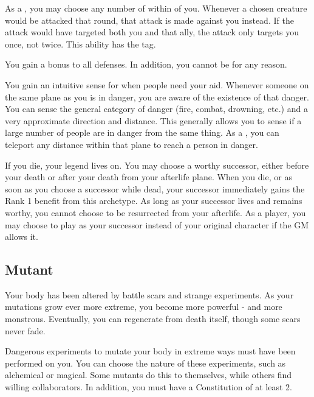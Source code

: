              As a , you may choose any number of  within \shortrange of you.
            Whenever a chosen creature would be attacked that round, that attack is made against you instead.
            If the attack would have targeted both you and that ally, the attack only targets you once, not twice.
            This ability has the  tag.

             You gain a  bonus to all defenses.
            In addition, you cannot be \vulnerable for any reason.

             You gain an intuitive sense for when people need your aid.
            Whenever someone on the same plane as you is in danger, you are aware of the existence of that danger.
            You can sense the general category of danger (fire, combat, drowning, etc.) and a very approximate direction and distance.
            This generally allows you to sense if a large number of people are in danger from the same thing.
            As a , you can teleport any distance within that plane to reach a person in danger.

             If you die, your legend lives on.
            You may choose a worthy successor, either before your death or after your death from your afterlife plane.
            When you die, or as soon as you choose a successor while dead, your successor immediately gains the Rank 1 benefit from this archetype.
            As long as your successor lives and remains worthy, you cannot choose to be resurrected from your afterlife.
            As a player, you may choose to play as your successor instead of your original character if the GM allows it.

    \subsection{Mutant}
        Your body has been altered by battle scars and strange experiments.
        As your mutations grow ever more extreme, you become more powerful - and more monstrous.
        Eventually, you can regenerate from death itself, though some scars never fade.

         Dangerous experiments to mutate your body in extreme ways must have been performed on you.
        You can choose the nature of these experiments, such as alchemical or magical.
        Some mutants do this to themselves, while others find willing collaborators.
        In addition, you must have a Constitution of at least 2.

